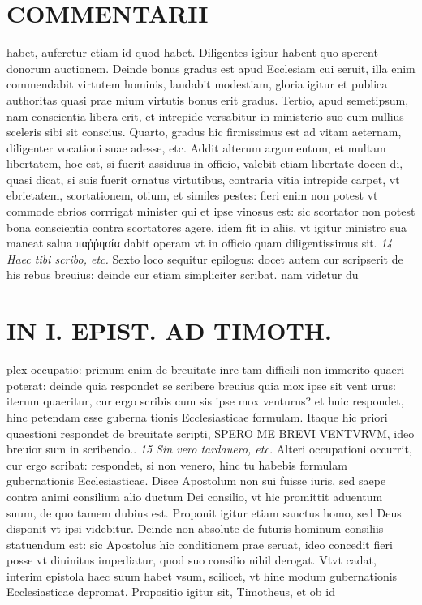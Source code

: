 \documentclass{article}
\begin{document}
\begin{pages}
\section*{COMMENTARII }
\marginpar{[ p.76 ]}\pstart habet, auferetur etiam id quod habet. Diligentes igitur habent quo sperent donorum auctionem. Deinde bonus gradus est apud Ecclesiam cui seruit, illa enim commendabit virtutem hominis, laudabit modestiam, gloria igitur et publica authoritas quasi prae mium virtutis bonus erit gradus. Tertio, apud semetipsum, nam conscientia libera erit, et intrepide versabitur in ministerio suo cum nullius sceleris sibi sit conscius. Quarto, gradus hic firmissimus est ad vitam aeternam, diligenter vocationi suae adesse, etc. Addit alterum argumentum, et multam libertatem, hoc est, si fuerit assiduus in officio, valebit etiam libertate docen di, quasi dicat, si suis fuerit ornatus virtutibus, contraria vitia intrepide carpet, vt ebrietatem, scortationem, otium, et similes pestes: fieri enim non potest vt commode ebrios corrrigat minister qui et ipse vinosus est: sic scortator non potest bona conscientia contra scortatores agere, idem fit in aliis, vt igitur ministro sua maneat salua παῤῥησία dabit operam vt in officio quam diligentissimus sit.  \pend
\textit{14 Haec tibi scribo, etc. }\pstart Sexto loco sequitur epilogus: docet autem cur scripserit de his rebus breuius: deinde cur etiam simpliciter scribat. nam videtur du\pend
\section*{IN I. EPIST. AD TIMOTH. }
\marginpar{[ p.77 ]}\pstart plex occupatio: primum enim de breuitate inre tam difficili non immerito quaeri poterat: deinde quia respondet se scribere breuius quia mox ipse sit vent urus: iterum quaeritur, cur ergo scribis cum sis ipse mox venturus? et huic respondet, hinc petendam esse guberna tionis Ecclesiasticae formulam. Itaque hic priori quaestioni respondet de breuitate scripti, SPERO ME BREVI VENTVRVM, ideo breuior sum in scribendo..  \pend
\textit{15 Sin vero tardauero, etc. }\pstart Alteri occupationi occurrit, cur ergo scribat: respondet, si non venero, hinc tu habebis formulam gubernationis Ecclesiasticae.  \pend\pstart Disce Apostolum non sui fuisse iuris, sed saepe contra animi consilium alio ductum Dei consilio, vt hic promittit aduentum suum, de quo tamem dubius est. Proponit igitur etiam sanctus homo, sed Deus disponit vt ipsi videbitur. Deinde non absolute de futuris hominum consiliis statuendum est: sic Apostolus hic conditionem prae seruat, ideo concedit fieri posse vt diuinitus impediatur, quod suo consilio nihil derogat. Vtvt cadat, interim epistola haec suum habet vsum, scilicet, vt hine modum gubernationis Ecclesiasticae depromat.  \pend\pstart Propositio igitur sit, Timotheus, et ob id  \pend

\end{pages}
\end{document}
